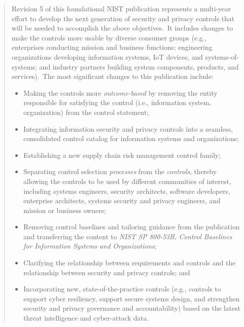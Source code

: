 \begin{formal}
\begin{quote}

Revision 5 of this foundational NIST publication represents a multi-year effort to develop the next generation of security and privacy controls that will be needed to accomplish the above objectives.\ It includes changes to make the controls more usable by diverse consumer groups (e.g., enterprises conducting mission and business functions; engineering organizations developing information systems, IoT devices, and systems-of-systems; and industry partners building system components, products, and services).\ The most significant changes to this publication include:
\vspace{10pt}

\begin{itemize}
\item Making the controls more \textit{outcome-based} by removing the entity responsible for satisfying the control (i.e., information system, organization) from the control statement;
\item Integrating information security and privacy controls into a seamless, consolidated control catalog for information systems and organizations;
\item Establishing a new supply chain risk management control family;
\item Separating control selection \textit{processes} from the \textit{controls}, thereby allowing the controls to be used by different communities of interest, including systems engineers, security architects, software developers, enterprise architects, systems security and privacy engineers, and mission or business owners;
\item Removing control baselines and tailoring guidance from the publication and transferring the content to \textit{NIST SP 800-53B, Control Baselines for Information Systems and Organizations};
\item Clarifying the relationship between requirements and controls and the relationship between security and privacy controls; and
\item Incorporating new, state-of-the-practice controls (e.g., controls to support cyber resiliency, support secure systems design, and strengthen security and privacy governance and accountability) based on the latest threat intelligence and cyber-attack data.
\end{itemize}
\vspace{10pt}


\end{quote}
\end{formal}
